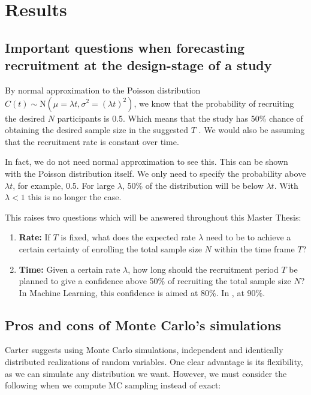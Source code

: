 

\chapter{Results}

\section{Important questions when forecasting recruitment at the design-stage of a study}

By normal approximation to the Poisson distribution $C(t)\sim \textrm{N}(\mu=\lambda t, \sigma^2=(\lambda t)^2)$, we know that the probability of recruiting the desired $N$ participants is 0.5. Which means that the study has 50\% chance of obtaining the desired sample size in the suggested $T$ \citep{carter2004application}. We would also be assuming that the recruitment rate is constant over time.

In fact, we do not need normal approximation to see this. This can be shown with the Poisson distribution itself. We only need to specify the probability above $\lambda t$, for example, 0.5. For large $\lambda$, 50\% of the distribution will be below $\lambda t$. With $\lambda < 1$ this is no longer the case. 

This raises two questions which will be answered throughout this Master Thesis:
\begin{enumerate}
\item \textbf{Rate:} If $T$ is fixed, what does the expected rate $\lambda$ need to be to achieve a certain certainty of enrolling the total sample size $N$ within the time frame $T$?
\item \textbf{Time:} Given a certain rate $\lambda$, how long should the recruitment period $T$ be planned to give a confidence above 50\% of recruiting the total sample size $N$? In Machine Learning, this confidence is aimed at 80\%. In \cite{carter2004application}, at 90\%.
\end{enumerate}

\section{Pros and cons of Monte Carlo's simulations}

Carter suggests using Monte Carlo simulations, independent and identically distributed realizations of random variables. One clear advantage is its flexibility, as we can simulate any distribution we want. However, we must consider the following when we compute MC sampling instead of exact:

